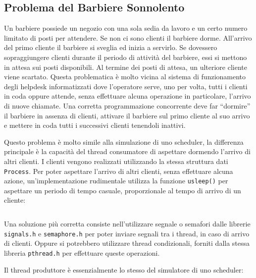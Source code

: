 \documentclass{article}
\numberwithin{equation}{subsection}
\begin{document}
\subsection{Problema del Barbiere Sonnolento}

Un barbiere possiede un negozio con una sola sedia da lavoro e un certo numero limitato di posti per attendere. Se non ci sono clienti il barbiere dorme. All'arrivo del primo cliente il barbiere si sveglia ed inizia a servirlo. 
Se dovessero sopraggiungere clienti durante il periodo di attività del barbiere, essi si mettono in attesa sui posti disponibili. Al termine dei posti di attesa, un ulteriore cliente viene scartato. Questa problematica è molto vicina al sistema di funzionamento degli helpdesk informatizzati dove l'operatore serve, uno per volta, tutti i clienti in coda oppure attende, senza effettuare alcuna operazione in particolare, l'arrivo di nuove chiamate. Una corretta programmazione concorrente deve far ``dormire'' il barbiere in assenza di clienti, attivare il barbiere sul primo cliente al suo arrivo e mettere in coda tutti i successivi clienti tenendoli inattivi.


Questo problema è molto simile alla simulazione di uno scheduler, la differenza principale è la capacità del thread consumatore di aspettare dormendo l'arrivo di altri clienti. I clienti vengono realizzati utilizzando la stessa struttura dati \verb|Process|. Per poter aspettare l'arrivo di altri clienti, senza effettuare alcuna azione, un'implementazione rudimentale utilizza la funzione \verb|usleep()| per aspettare un periodo di tempo casuale, proporzionale al tempo di arrivo di un cliente:
\inputminted[firstline=52, lastline=77, breaklines, breakanywhere, autogobble]{c}{./Programmazione Concorrente/barbiere_sonnolento.c}
Una soluzione più corretta consiste nell'utilizzare segnale o semafori dalle librerie \verb|signals.h| e \verb|semaphore.h| per poter inviare segnali tra i thread, in caso di arrivo di clienti. 
Oppure si potrebbero utilizzare thread condizionali, forniti dalla stessa libreria \verb|pthread.h| per effettuare queste operazioni. 

Il thread produttore è essenzialmente lo stesso del simulatore di uno scheduler:
\inputminted[firstline=79, lastline=100, breaklines, breakanywhere, autogobble]{c}{./Programmazione Concorrente/barbiere_sonnolento.c}

\clearpage
\end{document}
